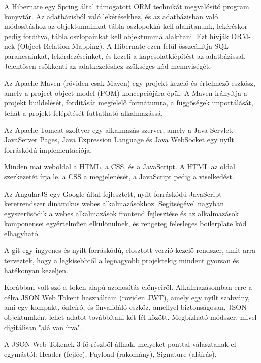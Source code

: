A Hibernate egy Spring által támogatott ORM technikát megvalósító program könyvtár. Az adatbázisból való lekérésekhez, és az adatbázisban való módosításhoz az objektumainkat tábla oszlopokká kell alakítanunk, lekéréskor pedig fordítva, tábla oszlopainkat kell objektummá alakítani. Ezt hívják ORM-nek (Object Relation Mapping). A Hibernate ezen felül összeállítja SQL parancsainkat, lekérdezéseinket, és kezeli a kapcsolatkiépítést az adatbázissal. Jelentősen csökkenti az adatkezeléshez szükséges kód mennyiségét. \cite{spring}

Az Apache Maven (röviden csak Maven) egy projekt kezelő és értelmező eszkösz, amely a project object model (POM) koncepciójára épül. A Maven irányítja a projekt buildelését, fordítását megfelelő formátumra, a függőségek importálását, tehát a projekt felépítését futtatható alkalmazássá. \cite{maven}

Az Apache Tomcat szoftver egy alkalmazás szerver, amely a Java Servlet, JavaServer Pages, Java Expression Language és Java WebSocket egy nyílt forráskódú implementációja. \cite{tomcat}

Minden mai weboldal a HTML, a CSS, és a JavaScript. A HTML az oldal szerkezetét írja le, a CSS a megjelenését, a JavaScript pedig a viselkedést.

Az AngularJS egy Google által fejlesztett, nyílt forráskódú JavaScript keretrendszer dinamikus webes alkalmazásokhoz. Segítségével nagyban egyszerűsödik a webes alkalmazások frontend fejlesztése és az alkalmazások komponensei egyértelműen elkülönülnek, és rengeteg felesleges boilerplate kód elhagyható. \cite{angularjs}

A git egy ingyenes és nyílt forráskódú, elosztott verzió kezelő rendszer, amit arra terveztek, hogy a legkisebbtől a legnagyobb projektekig mindent gyorsan és hatékonyan kezeljen. \cite{git}


Korábban volt szó a token alapú azonosítás előnyeiről. Alkalmazásomban erre a célra JSON Web Tokent használtam (röviden JWT), amely egy nyílt szabvány, ami egy kompakt, önleíró, és önvalidáló eszköz, amellyel biztonságosan, JSON objektumként lehet adatot továbbítani két fél között. Megbízható módszer, mivel digitálisan "alá van írva".

A JSON Web Tokenek 3 fő részből állnak, melyeket ponttal választanak el egymástól: Header (fejléc), Payload (rakomány), Signature (aláírás).

